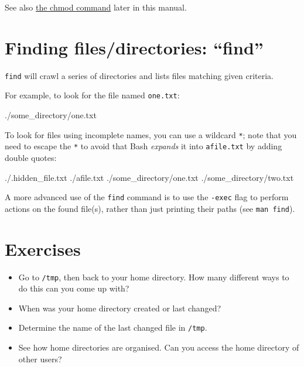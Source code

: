 See also \hyperref[sec:chmod]{the chmod command} later in this manual.

\section{Finding files/directories: ``find''}

\verb|find| will crawl a series of directories and lists files matching given criteria.

For example, to look for the file named \verb|one.txt|:

\begin{prompt}
./some_directory/one.txt
\end{prompt}

To look for files using incomplete names, you can use a wildcard \verb|*|; note
that you need to escape the \verb|*| to avoid that Bash \emph{expands} it into
\verb|afile.txt| by adding double quotes:

\begin{prompt}
./.hidden_file.txt
./afile.txt
./some_directory/one.txt
./some_directory/two.txt
\end{prompt}

A more advanced use of the \verb|find| command is to use the \verb|-exec| flag
to perform actions on the found file(s), rather than just printing their paths (see \verb|man find|).

\section{Exercises}

\begin{itemize}
    \item Go to \verb|/tmp|, then back to your home directory.
        How many different ways to do this can you come up with?
    \item When was your home directory created or last changed?
    \item Determine the name of the last changed file in \verb|/tmp|.
    \item See how home directories are organised.
        Can you access the home directory of other users?
\end{itemize}
